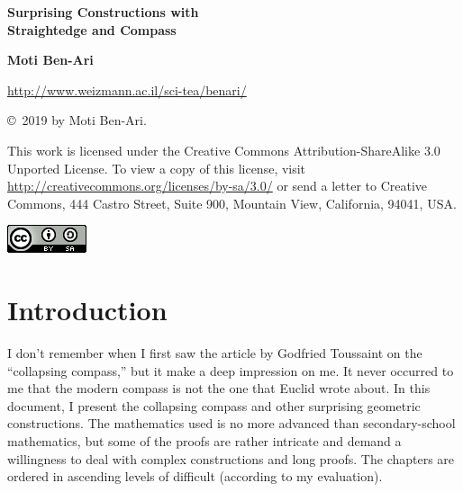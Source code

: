 
\thispagestyle{empty}

\begin{center}
\textbf{\LARGE Surprising Constructions with\\\bigskip Straightedge and Compass}

\bigskip
\bigskip
\bigskip
\bigskip

\textbf{\Large Moti Ben-Ari}

\bigskip
\bigskip

\url{http://www.weizmann.ac.il/sci-tea/benari/}
\end{center}



\vfill

\begin{footnotesize}
\begin{center}
\copyright{}\ 2019 by Moti Ben-Ari.
\end{center}

This work is licensed under the Creative Commons Attribution-ShareAlike 3.0 Unported License. To view a copy of this license, visit \url{http://creativecommons.org/licenses/by-sa/3.0/} or send a letter to Creative Commons, 444 Castro Street, Suite 900, Mountain View, California, 94041, USA.
\end{footnotesize}

\bigskip

\begin{center}
\includegraphics[width=.15\textwidth]{../../by-sa.png}
\end{center}

\newpage
\thispagestyle{empty}
\mbox{}
\newpage
\thispagestyle{empty}

\tableofcontents
\newpage
\mbox{}
\newpage

\chapter*{Introduction}

I don't remember when I first saw the article by Godfried Toussaint \cite{toussaint} on the ``collapsing compass,'' but it make a deep impression on me. It never occurred to me that the modern compass is not the one that Euclid wrote about. In this document, I present the collapsing compass and other surprising geometric constructions. The mathematics used is no more advanced than secondary-school mathematics, but some of the proofs are rather intricate and demand a willingness to deal with complex constructions and long proofs. The chapters are ordered in ascending levels of difficult (according to my evaluation).

